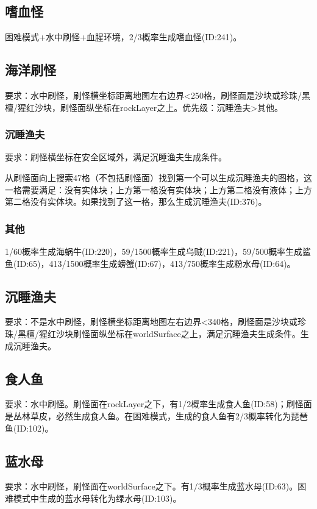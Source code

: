 \subsection{嗜血怪}
困难模式+水中刷怪+血腥环境，2/3概率生成嗜血怪(ID:241)。

\subsection{海洋刷怪}
要求：水中刷怪，刷怪横坐标距离地图左右边界<250格，刷怪面是沙块或珍珠/黑檀/猩红沙块，刷怪面纵坐标在rockLayer之上。优先级：沉睡渔夫>其他。

\subsubsection{沉睡渔夫}
要求：刷怪横坐标在安全区域外，满足沉睡渔夫生成条件。

从刷怪面向上搜索47格（不包括刷怪面）找到第一个可以生成沉睡渔夫的图格，这一格需要满足：没有实体块；上方第一格没有实体块；上方第二格没有液体；上方第二格没有实体块。如果找到了这一格，那么生成沉睡渔夫(ID:376)。

\subsubsection{其他}
1/60概率生成海蜗牛(ID:220)，59/1500概率生成乌贼(ID:221)，59/500概率生成鲨鱼(ID:65)，413/1500概率生成螃蟹(ID:67)，413/750概率生成粉水母(ID:64)。

\subsection{沉睡渔夫}
要求：不是水中刷怪，刷怪横坐标距离地图左右边界<340格，刷怪面是沙块或珍珠/黑檀/猩红沙块刷怪面纵坐标在worldSurface之上，满足沉睡渔夫生成条件。生成沉睡渔夫。

\subsection{食人鱼}
要求：水中刷怪。刷怪面在rockLayer之下，有1/2概率生成食人鱼(ID:58)；刷怪面是丛林草皮，必然生成食人鱼。在困难模式，生成的食人鱼有2/3概率转化为琵琶鱼(ID:102)。

\subsection{蓝水母}
要求：水中刷怪，刷怪面在worldSurface之下。有1/3概率生成蓝水母(ID:63)。困难模式中生成的蓝水母转化为绿水母(ID:103)。

